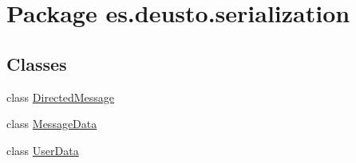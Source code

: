 \hypertarget{namespacees_1_1deusto_1_1serialization}{}\section{Package es.\+deusto.\+serialization}
\label{namespacees_1_1deusto_1_1serialization}
\subsection*{Classes}
\begin{DoxyCompactItemize}
\item 
class \mbox{\hyperlink{classes_1_1deusto_1_1serialization_1_1_directed_message}{Directed\+Message}}
\item 
class \mbox{\hyperlink{classes_1_1deusto_1_1serialization_1_1_message_data}{Message\+Data}}
\item 
class \mbox{\hyperlink{classes_1_1deusto_1_1serialization_1_1_user_data}{User\+Data}}
\end{DoxyCompactItemize}
